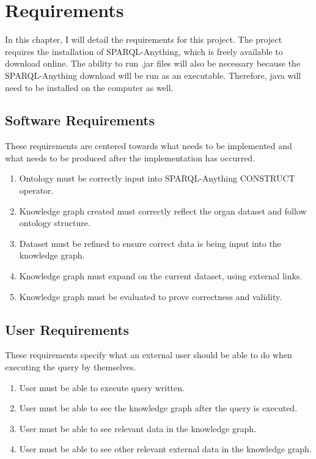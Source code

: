 \chapter{Requirements}
In this chapter, I will detail the requirements for this project. The project requires the installation of SPARQL-Anything, which is freely available to download online. The ability to run .jar files will also be necessary because the SPARQL-Anything download will be run as an executable. Therefore, java will need to be installed on the computer as well.

\section{Software Requirements}
\hspace{0.5cm} These requirements are centered towards what needs to be implemented and what needs to be produced after the implementation has occurred. 
\begin{enumerate}
\item Ontology must be correctly input into SPARQL-Anything CONSTRUCT operator.
\item Knowledge graph created must correctly reflect the organ dataset and follow ontology structure.
\item Dataset must be refined to ensure correct data is being input into the knowledge graph.
\item Knowledge graph must expand on the current dataset, using external links.
\item Knowledge graph must be evaluated to prove correctness and validity.
\end{enumerate}

\section{User Requirements}
\hspace{0.5cm} These requirements specify what an external user should be able to do when executing the query by themselves. 
\begin{enumerate}
\item User must be able to execute query written.
\item User must be able to see the knowledge graph after the query is executed.
\item User must be able to see relevant data in the knowledge graph.
\item User must be able to see other relevant external data in the knowledge graph.
\end{enumerate}

